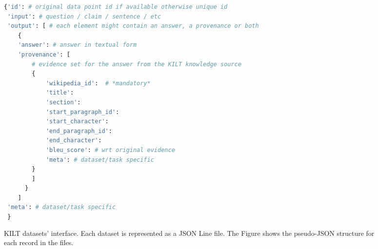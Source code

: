 \documentclass[11pt]{article}
\begin{document}
 \begin{figure*}[!ht]
\centering
\begin{lstlisting}[language=Python,firstnumber=1]
{'id': # original data point id if available otherwise unique id
 'input': # question / claim / sentence / etc
 'output': [ # each element might contain an answer, a provenance or both
    {
    'answer': # answer in textual form
    'provenance': [
        # evidence set for the answer from the KILT knowledge source
        {
            'wikipedia_id':  # *mandatory* 
            'title': 
            'section': 
            'start_paragraph_id': 
            'start_character': 
            'end_paragraph_id':
            'end_character': 
            'bleu_score': # wrt original evidence
            'meta': # dataset/task specific
        }
        ] 
      }
    ]
 'meta': # dataset/task specific
 }
\end{lstlisting}
    \caption{KILT datasets' interface. Each dataset is represented as a JSON Line file. The Figure shows the pseudo-JSON structure for each record in the files.}
    \label{fig:interface}
\end{figure*} 
\end{document}
